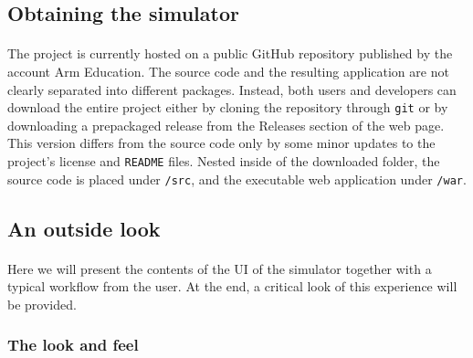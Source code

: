 \subsection{Obtaining the simulator}
\paragraph{}
The project is currently hosted on a public GitHub repository \cite{legv8simARMrepogit} published by the account Arm Education. The source code and the resulting application are not clearly separated into different packages. Instead, both users and developers can download the entire project either by cloning the repository through \verb|git| \cite{gitweb} or by downloading a prepackaged release from the Releases section of the web page. This version differs from the source code only by some minor updates to the project's license and \verb|README| files. Nested inside of the downloaded folder, the source code is placed under \verb|/src|, and the executable web application under \verb|/war|.

\subsection{An outside look}\label{chap:chap1outsidelook}
\paragraph{}
Here we will present the contents of the UI of the simulator together with a typical workflow from the user. At the end, a critical look of this experience will be provided.
\subsubsection{The look and feel}
